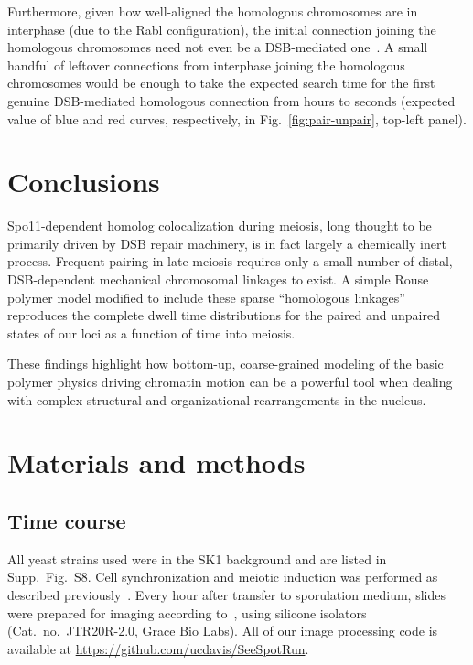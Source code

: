 \documentclass[9pt,twocolumn,twoside,lineno]{pnas-new}
\begin{document}
Furthermore, given how well-aligned the homologous chromosomes are in interphase (due to the Rabl configuration), the initial connection joining the homologous chromosomes need not even be a DSB-mediated one~\cite{burgess1999}. A small handful of leftover connections from interphase joining the homologous chromosomes would be enough to take the expected search time for the first genuine DSB-mediated homologous connection from hours to seconds (expected value of blue and red curves, respectively, in Fig.~\ref{fig:pair-unpair}, top-left panel).

\section*{Conclusions}

Spo11-dependent homolog colocalization during meiosis, long thought to be primarily driven by DSB repair machinery, is in fact largely a chemically inert process.
Frequent pairing in late meiosis requires only a small number of distal, DSB-dependent mechanical chromosomal linkages to exist.
A simple Rouse polymer model modified to include these sparse ``homologous linkages'' reproduces the complete dwell time distributions for the paired and unpaired states of our loci as a function of time into meiosis.

These findings highlight how bottom-up, coarse-grained modeling of the basic polymer physics driving chromatin motion can be a powerful tool when dealing with complex structural and organizational rearrangements in the nucleus.


\section*{Materials and methods}

\subsection*{Time course}


All yeast strains used were in the SK1 background and are listed in Supp.\ Fig.\ S8.
Cell synchronization and meiotic induction was performed as described
previously~\cite{lui2009}. Every hour after transfer to sporulation medium, slides were prepared for imaging according to~\cite{dresser2009}, using silicone
isolators (Cat.\ no.\ JTR20R-2.0, Grace Bio Labs). All of our image processing
code is available at \url{https://github.com/ucdavis/SeeSpotRun}.
\end{document}
